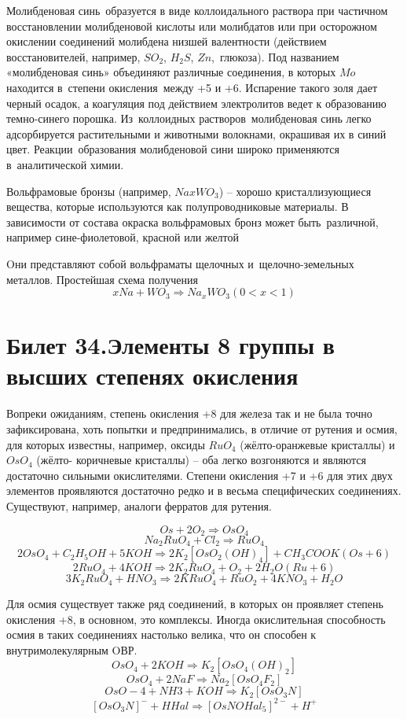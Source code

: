 \documentclass[11pt]{article}
\begin{document}
Молибденовая синь образуется в виде коллоидального раствора при частичном восстановлении молибденовой кислоты или молибдатов или при осторожном окислении соединений молибдена низшей валентности (действием восстановителей, например, $SO_2$, $H_2S$, $Zn$, глюкоза). Под названием «молибденовая синь» объединяют различные соединения, в которых $Mo$ находится в степени окисления между +5 и +6. Испарение такого золя дает черный осадок, а коагуляция под действием электролитов ведет к образованию темно-синего порошка. Из коллоидных растворов молибденовая синь легко адсорбируется растительными и животными волокнами, окрашивая их в синий цвет. Реакции образования молибденовой сини широко применяются в аналитической химии.

Вольфрамовые бронзы (например, $NaxWO_3$) – хорошо кристаллизующиеся вещества, которые используются как полупроводниковые материалы. В зависимости от состава окраска вольфрамовых бронз может быть различной, например сине-фиолетовой, красной или желтой 

Oни представляют собой вольфраматы щелочных и щелочно-земельных металлов. Простейшая схема получения 
$$xNa+WO_3 \Rightarrow Na_xWO_3 (0<x<1)$$

\section{Билет 34.Элементы 8 группы в высших степенях окисления}

Вопреки ожиданиям, степень окисления +8 для железа так и не была точно
зафиксирована, хоть попытки и предпринимались, в отличие от рутения и осмия, для
которых известны, например, оксиды $RuO _4$ (жёлто-оранжевые кристаллы) и $OsO _4$ (жёлто-
коричневые кристаллы) – оба легко возгоняются и являются достаточно сильными
окислителями. Степени окисления +7 и +6 для этих двух элементов проявляются
достаточно редко и в весьма специфических соединениях. Существуют, например,
аналоги ферратов для рутения.

$$Os + 2O _2 \Rightarrow OsO _4$$
$$Na _2 RuO_ 4 + Cl _2 \Rightarrow RuO _4$$
$$2OsO _4 + C _2 H _5 OH + 5KOH \Rightarrow 2K _2 [OsO _2 (OH) _4 ] + CH _3 COOK (Os +6)$$
$$2RuO _4 + 4KOH \Rightarrow 2K _2 RuO _4 + O _2 + 2H _2 O (Ru +6)$$
$$3K _2 RuO _4 + HNO _3 \Rightarrow 2KRuO _4 + RuO _2 + 4KNO _3 + H _2 O$$

Для осмия существует также ряд соединений, в которых он проявляет степень окисления
+8, в основном, это комплексы. Иногда окислительная способность осмия в таких
соединениях настолько велика, что он способен к внутримолекулярным OВР.
$$OsO _4 + 2KOH \Rightarrow K _2 [OsO _4 (OH) _2 ]$$
$$OsO _4 + 2NaF \Rightarrow Na _2 [OsO _4 F _2 ]$$
$$OsO -4 + NH 3 + KOH \Rightarrow K _2 [OsO _3 N]$$
$$[OsO _3 N]^- + HHal \Rightarrow [OsNOHal _5 ]^{2-} + H^+$$
\end{document}
